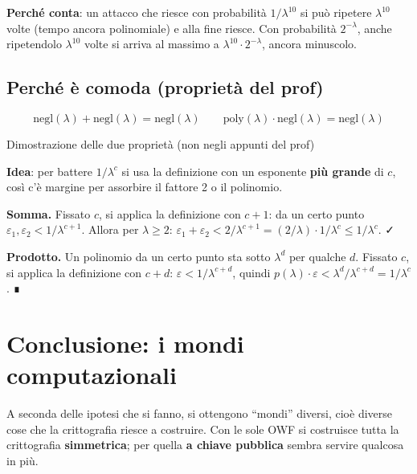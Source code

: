 \textbf{Perché conta}: un attacco che riesce con probabilità \(1/\lambda^{10}\) si può ripetere \(\lambda^{10}\) volte (tempo ancora polinomiale) e alla fine riesce. Con probabilità \(2^{-\lambda}\), anche ripetendolo \(\lambda^{10}\) volte si arriva al massimo a \(\lambda^{10} \cdot 2^{-\lambda}\), ancora minuscolo.

\subsection{Perché è comoda (proprietà del prof)}

\[
\text{negl}(\lambda) + \text{negl}(\lambda) = \text{negl}(\lambda) \qquad \text{poly}(\lambda) \cdot \text{negl}(\lambda) = \text{negl}(\lambda)
\]

\begin{approfondimento}{Dimostrazione delle due proprietà (non negli appunti del prof)}

\textbf{Idea}: per battere \(1/\lambda^c\) si usa la definizione con un esponente \textbf{più grande} di \(c\), così c'è margine per assorbire il fattore 2 o il polinomio.

\textbf{Somma.} Fissato \(c\), si applica la definizione con \(c+1\): da un certo punto \(\varepsilon_1, \varepsilon_2 < 1/\lambda^{c+1}\). Allora per \(\lambda \ge 2\): \(\varepsilon_1 + \varepsilon_2 < 2/\lambda^{c+1} = (2/\lambda) \cdot 1/\lambda^c \le 1/\lambda^c\). ✓

\textbf{Prodotto.} Un polinomio da un certo punto sta sotto \(\lambda^d\) per qualche \(d\). Fissato \(c\), si applica la definizione con \(c + d\): \(\varepsilon < 1/\lambda^{c+d}\), quindi \(p(\lambda) \cdot \varepsilon < \lambda^d / \lambda^{c+d} = 1/\lambda^c\). ∎

\end{approfondimento}

\section{Conclusione: i mondi computazionali}

\begin{inbreve}

A seconda delle ipotesi che si fanno, si ottengono ``mondi'' diversi, cioè diverse cose che la crittografia riesce a costruire. Con le sole OWF si costruisce tutta la crittografia \textbf{simmetrica}; per quella \textbf{a chiave pubblica} sembra servire qualcosa in più.

\end{inbreve}

